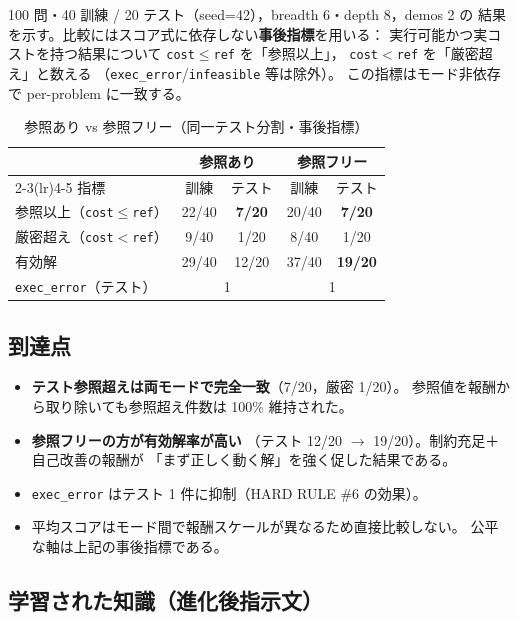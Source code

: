 \documentclass[uplatex,dvipdfmx,a4paper,11pt]{jsarticle}
\begin{document}
100 問・40 訓練 / 20 テスト（seed=42），breadth 6・depth 8，demos 2 の
結果を示す。比較にはスコア式に依存しない\textbf{事後指標}を用いる：
実行可能かつ実コストを持つ結果について
\texttt{cost}$\le$\texttt{ref} を「参照以上」，
\texttt{cost}$<$\texttt{ref} を「厳密超え」と数える
（\texttt{exec\_error}/\texttt{infeasible} 等は除外）。
この指標はモード非依存で per-problem に一致する。

\begin{table}[htbp]
  \centering
  \caption{参照あり vs 参照フリー（同一テスト分割・事後指標）}
  \label{tab:results}
  \begin{tabular}{lcccc}
    \toprule
    & \multicolumn{2}{c}{参照あり} & \multicolumn{2}{c}{参照フリー} \\
    \cmidrule(lr){2-3}\cmidrule(lr){4-5}
    指標 & 訓練 & テスト & 訓練 & テスト \\
    \midrule
    参照以上（\texttt{cost}$\le$\texttt{ref}） & 22/40 & \textbf{7/20} & 20/40 & \textbf{7/20} \\
    厳密超え（\texttt{cost}$<$\texttt{ref}） & 9/40 & 1/20 & 8/40 & 1/20 \\
    有効解 & 29/40 & 12/20 & 37/40 & \textbf{19/20} \\
    \texttt{exec\_error}（テスト） & \multicolumn{2}{c}{1} & \multicolumn{2}{c}{1} \\
    \bottomrule
  \end{tabular}
\end{table}

\subsection{到達点}

\begin{itemize}
  \item \textbf{テスト参照超えは両モードで完全一致}（7/20，厳密 1/20）。
    参照値を報酬から取り除いても参照超え件数は 100\% 維持された。
  \item \textbf{参照フリーの方が有効解率が高い}
    （テスト 12/20 $\to$ 19/20）。制約充足＋自己改善の報酬が
    「まず正しく動く解」を強く促した結果である。
  \item \texttt{exec\_error} はテスト 1 件に抑制（HARD RULE \#6 の効果）。
  \item 平均スコアはモード間で報酬スケールが異なるため直接比較しない。
    公平な軸は上記の事後指標である。
\end{itemize}

\subsection{学習された知識（進化後指示文）}
\end{document}
